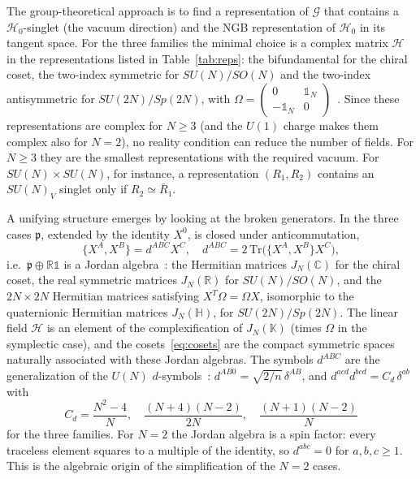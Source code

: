 \documentclass[aps,prd,twocolumn,superscriptaddress,nofootinbib,floatfix]{revtex4-2}
\theoremstyle{remark}
\newcommand{\Tr}{\mathrm{Tr}}
\newcommand{\Hf}{\mathcal{H}}      %
\newcommand{\G}{\mathcal{G}}
\newcommand{\Hg}{\mathcal{H}_0}    %
\newcommand{\p}{\mathfrak{p}}
\newcommand{\ie}{i.e.}
\begin{document}
The group-theoretical approach is to find a representation of $\G$ that contains a $\Hg$-singlet (the vacuum direction) and the NGB representation of $\Hg$ in its tangent space. For the three families the minimal choice is a complex matrix $\Hf$ in the representations listed in Table~\ref{tab:reps}: the bifundamental for the chiral coset, the two-index symmetric for $SU(N)/SO(N)$ and the two-index antisymmetric for $SU(2N)/Sp(2N)$, with $\Omega=\left(\begin{smallmatrix}0&\mathbb{1}_N\\-\mathbb{1}_N&0\end{smallmatrix}\right)$~\cite{Peskin:1980gc,Preskill:1980mz,Dimopoulos:1981xc,Kogut:2000ek}. Since these representations are complex for $N\ge3$ (and the $U(1)$ charge makes them complex also for $N=2$), no reality condition can reduce the number of fields. For $N\ge3$ they are the smallest representations with the required vacuum. For $SU(N)\times SU(N)$, for instance, a representation $(R_1,R_2)$ contains an $SU(N)_V$ singlet only if $R_2\simeq\bar R_1$.

A unifying structure emerges by looking at the broken generators. In the three cases $\p$, extended by the identity $X^0$, is closed under anticommutation,
\begin{equation}
\{X^A,X^B\}=d^{ABC}X^C,\quad d^{ABC}=2\,\Tr\big(\{X^A,X^B\}X^C\big),
\label{eq:ddef}
\end{equation}
\ie\ $\p\oplus\mathbb{R}\mathbb{1}$ is a Jordan algebra~\cite{Jordan:1933vh,FarautKoranyi}: the Hermitian matrices $J_N(\mathbb{C})$ for the chiral coset, the real symmetric matrices $J_N(\mathbb{R})$ for $SU(N)/SO(N)$, and the $2N\times2N$ Hermitian matrices satisfying $X^T\Omega=\Omega X$, isomorphic to the quaternionic Hermitian matrices $J_N(\mathbb{H})$, for $SU(2N)/Sp(2N)$. The linear field $\Hf$ is an element of the complexification of $J_N(\mathbb K)$ (times $\Omega$ in the symplectic case), and the cosets~\eqref{eq:cosets} are the compact symmetric spaces naturally associated with these Jordan algebras. The symbols $d^{ABC}$ are the generalization of the $U(N)$ $d$-symbols~\cite{Haber:2019sgz}: $d^{AB0}=\sqrt{2/n}\,\delta^{AB}$, and $d^{acd}d^{bcd}=C_d\,\delta^{ab}$ with
\begin{equation}
C_d=\frac{N^2-4}{N},\quad \frac{(N+4)(N-2)}{2N},\quad \frac{(N+1)(N-2)}{N}
\label{eq:Cd}
\end{equation}
for the three families. For $N=2$ the Jordan algebra is a spin factor: every traceless element squares to a multiple of the identity, so $d^{abc}=0$ for $a,b,c\geq1$. This is the algebraic origin of the simplification of the $N=2$ cases.
\end{document}
